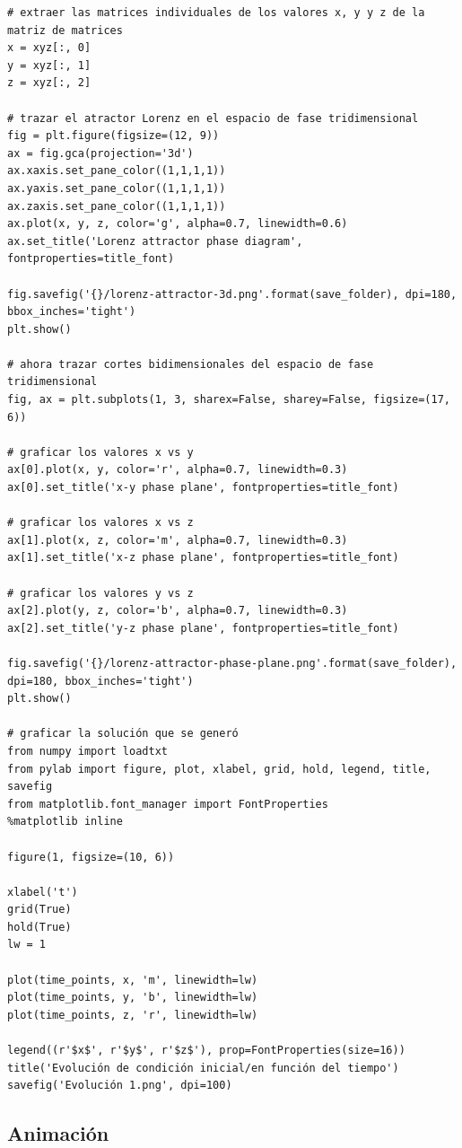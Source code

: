 \documentclass[12pt]{article}
\begin{document}
\begin{verbatim}
# extraer las matrices individuales de los valores x, y y z de la matriz de matrices
x = xyz[:, 0]
y = xyz[:, 1]
z = xyz[:, 2]

# trazar el atractor Lorenz en el espacio de fase tridimensional
fig = plt.figure(figsize=(12, 9))
ax = fig.gca(projection='3d')
ax.xaxis.set_pane_color((1,1,1,1))
ax.yaxis.set_pane_color((1,1,1,1))
ax.zaxis.set_pane_color((1,1,1,1))
ax.plot(x, y, z, color='g', alpha=0.7, linewidth=0.6)
ax.set_title('Lorenz attractor phase diagram', fontproperties=title_font)

fig.savefig('{}/lorenz-attractor-3d.png'.format(save_folder), dpi=180, bbox_inches='tight')
plt.show()

# ahora trazar cortes bidimensionales del espacio de fase tridimensional
fig, ax = plt.subplots(1, 3, sharex=False, sharey=False, figsize=(17, 6))

# graficar los valores x vs y
ax[0].plot(x, y, color='r', alpha=0.7, linewidth=0.3)
ax[0].set_title('x-y phase plane', fontproperties=title_font)

# graficar los valores x vs z
ax[1].plot(x, z, color='m', alpha=0.7, linewidth=0.3)
ax[1].set_title('x-z phase plane', fontproperties=title_font)

# graficar los valores y vs z
ax[2].plot(y, z, color='b', alpha=0.7, linewidth=0.3)
ax[2].set_title('y-z phase plane', fontproperties=title_font)

fig.savefig('{}/lorenz-attractor-phase-plane.png'.format(save_folder), dpi=180, bbox_inches='tight')
plt.show()

# graficar la solución que se generó
from numpy import loadtxt
from pylab import figure, plot, xlabel, grid, hold, legend, title, savefig
from matplotlib.font_manager import FontProperties
%matplotlib inline 

figure(1, figsize=(10, 6))

xlabel('t')
grid(True)
hold(True)
lw = 1

plot(time_points, x, 'm', linewidth=lw)
plot(time_points, y, 'b', linewidth=lw)
plot(time_points, z, 'r', linewidth=lw)

legend((r'$x$', r'$y$', r'$z$'), prop=FontProperties(size=16))
title('Evolución de condición inicial/en función del tiempo')
savefig('Evolución 1.png', dpi=100)

\end{verbatim}

\subsection{Animación}
\end{document}
